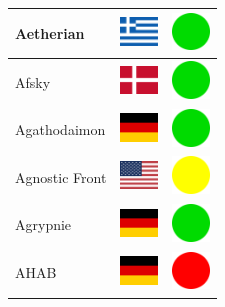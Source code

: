 \documentclass[12pt, a4paper, twoside]{report}
\begin{document}
\begin{center}
\begin{longtable}{|p{5cm}|p{2cm}|p{2cm}|}
 Aetherian                                                  & \includegraphics[width=1cm]{../img/flags/gr} &   \includegraphics[width=1cm]{../likes/y} \\ \hline
 Afsky                                                      & \includegraphics[width=1cm]{../img/flags/dk} &   \includegraphics[width=1cm]{../likes/y} \\ \hline
 Agathodaimon                                               & \includegraphics[width=1cm]{../img/flags/de} &   \includegraphics[width=1cm]{../likes/y} \\ \hline
 Agnostic Front                                             & \includegraphics[width=1cm]{../img/flags/us} &   \includegraphics[width=1cm]{../likes/m} \\ \hline
 Agrypnie                                                   & \includegraphics[width=1cm]{../img/flags/de} &   \includegraphics[width=1cm]{../likes/y} \\ \hline
 AHAB                                                       & \includegraphics[width=1cm]{../img/flags/de} &   \includegraphics[width=1cm]{../likes/n} \\ \hline

\end{longtable}
\end{center}
\end{document}
